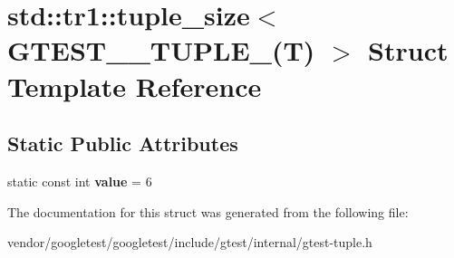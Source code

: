 \hypertarget{structstd_1_1tr1_1_1tuple__size_3_01GTEST__6__TUPLE___07T_08_01_4}{}\section{std\+:\+:tr1\+:\+:tuple\+\_\+size$<$ G\+T\+E\+S\+T\+\_\+\_\+\+T\+U\+P\+L\+E\+\_\+(T) $>$ Struct Template Reference}
\label{structstd_1_1tr1_1_1tuple__size_3_01GTEST__6__TUPLE___07T_08_01_4}
\subsection*{Static Public Attributes}
\begin{DoxyCompactItemize}
\item 
static const int {\bfseries value} = 6\hypertarget{structstd_1_1tr1_1_1tuple__size_3_01GTEST__6__TUPLE___07T_08_01_4_a8c6740533d301f5d47f86ef5370a4b06}{}\label{structstd_1_1tr1_1_1tuple__size_3_01GTEST__6__TUPLE___07T_08_01_4_a8c6740533d301f5d47f86ef5370a4b06}

\end{DoxyCompactItemize}


The documentation for this struct was generated from the following file\+:\begin{DoxyCompactItemize}
\item 
vendor/googletest/googletest/include/gtest/internal/gtest-\/tuple.\+h\end{DoxyCompactItemize}

